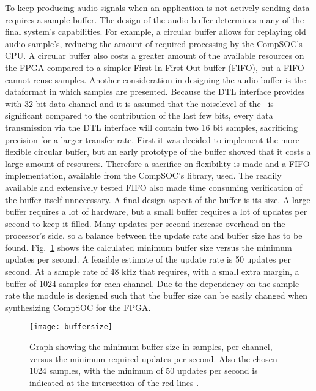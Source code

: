 To keep producing audio signals when an application is not actively sending data requires a sample buffer. The design of the audio buffer determines many of the final system's capabilities. For example, a circular buffer allows for replaying old audio sample's, reducing the amount of required processing by the CompSOC's CPU. A circular buffer also costs a greater amount of the available resources on the FPGA compared to a simpler First In First Out buffer (FIFO), but a FIFO cannot reuse samples. Another consideration in designing the audio buffer is the dataformat in which samples are presented. Because the DTL interface provides with 32 bit data channel and it is assumed that the noiselevel of the \cs~is significant compared to the contribution of the last few bits, every data transmission via the DTL interface will contain two 16 bit samples, sacrificing precision for a larger transfer rate. First it was decided to implement the more flexible circular buffer, but an early prototype of the buffer showed that it costs a large amount of resources. Therefore a sacrifice on flexibility is made and a FIFO implementation, available from the CompSOC's library, used. The readily available and extensively tested FIFO also made time consuming verification of the buffer itself unnecessary. A final design aspect of the buffer is its size. A large buffer requires a lot of hardware, but a small buffer requires a lot of updates per second to keep it filled. Many updates per second increase overhead on the processor's side, so a balance between the update rate and buffer size has to be found. Fig.~\ref{fig:buffersize} shows the calculated minimum buffer size versus the minimum updates per second. A feasible estimate of the update rate is 50 updates per second. At a sample rate of 48 kHz that requires, with a small extra margin, a buffer of 1024 samples for each channel. Due to the dependency on the sample rate the module is designed such that the buffer size can be easily changed when synthesizing CompSOC for the FPGA. 
\begin{figure}[h]
 \texttt{[image: buffersize]}
 \caption{Graph showing the minimum buffer size in samples, per channel, versus the minimum required updates per second. Also the chosen 1024 samples, with the minimum of 50 updates per second is indicated at the intersection of the red lines .}
 \label{fig:buffersize}
\end{figure}

